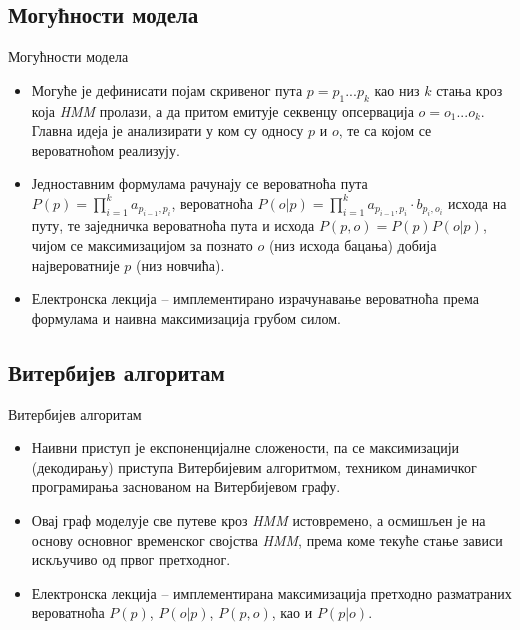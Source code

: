 \documentclass[hyperref={bookmarks=false}]{beamer}
\begin{document}
\subsection{Могућности модела}
\begin{frame}{Могућности модела}
\begin{itemize}
\item Могуће је дефинисати појам скривеног пута $p = p_1...p_k$ као низ $k$ стања кроз која \textit{HMM} пролази, а да притом емитује секвенцу опсервација $o = o_1...o_k$. Главна идеја је анализирати у ком су односу $p$ и $o$, те са којом се вероватноћом реализују.
\item Једноставним формулама рачунају се вероватноћа пута $P(p) = \prod_{i=1}^k a_{p_{i-1}, p_i}$, вероватноћа $P(o | p) = \prod_{i=1}^k a_{p_{i-1}, p_i} \cdot b_{p_i, o_i}$ исхода на путу, те заједничка вероватноћа пута и исхода $P(p, o) = P(p) P(o | p)$, чијом се максимизацијом за познато $o$ (низ исхода бацања) добија највероватније $p$ (низ новчића).
\item Електронска лекција -- имплементирано израчунавање вероватноћа према формулама и наивна максимизација грубом силом.
\end{itemize}
\end{frame}

\subsection{Витербијев алгоритам}
\begin{frame}{Витербијев алгоритам}
\begin{itemize}
\item Наивни приступ је експоненцијалне сложености, па се максимизацији (декодирању) приступа Витербијевим алгоритмом, техником динамичког програмирања заснованом на Витербијевом графу.
\item Овај граф моделује све путеве кроз \textit{HMM} истовремено, а осмишљен је на основу основног временског својства \textit{HMM}, према коме текуће стање зависи искључиво од првог претходног.
\item Електронска лекција -- имплементирана максимизација претходно разматраних вероватноћа $P(p)$, $P(o | p)$, $P(p, o)$, као и $P(p | o)$.
\end{itemize}
\end{frame}
\end{document}
